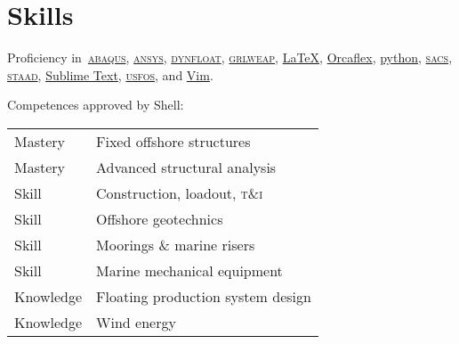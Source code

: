 \section*{Skills} %
\label{sec:comp}

Proficiency in~\href{https://www.3ds.com/products-services/simulia/products/abaqus/}{\textsc{abaqus}}, \href{https://www.ansys.com/products/structures}{\textsc{ansys}}, \href{https://www.marin.nl/nl/about/facilities-and-tools/software}{\textsc{dynfloat}}, \href{https://www.pile.com/products/grlweap/}{\textsc{grlweap}}, \href{https://www.latex-project.org}{\LaTeX}, \href{https://www.orcina.com/orcaflex/}{Orcaflex}, \href{https://www.python.org}{python}, \href{https://www.bentley.com/software/sacs-offshore-structure/}{\textsc{sacs}}, \href{https://www.bentley.com/software/staad/}{\textsc{staad}}, \href{https://www.sublimetext.com}{Sublime Text}, \href{https://www.usfos.com}{\textsc{usfos}}, and \href{https://neovim.io}{Vim}. 

Competences approved by Shell:

\noindent\begin{tabular}{l l}
  Mastery & Fixed offshore structures \\
  Mastery & Advanced structural analysis \\
  Skill & Construction, loadout, \textsc{t\&i} \\
  Skill & Offshore geotechnics \\
  Skill & Moorings \& marine risers \\
  Skill & Marine mechanical equipment \\
  Knowledge & Floating production system design \\
  Knowledge & Wind energy \\
\end{tabular}

